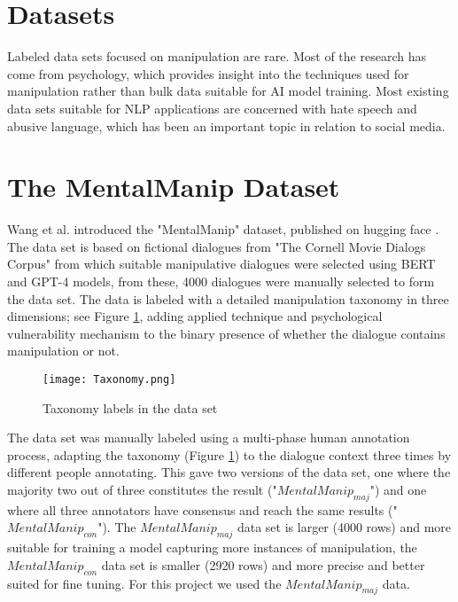 \documentclass[
	letterpaper, %
	12pt, %
	unnumberedsections, %
	twoside, %
]{LTJournalArticle}
\begin{document}
\section{Datasets}
Labeled data sets focused on manipulation are rare. Most of the research has come from psychology, which provides insight into the techniques used for manipulation rather than bulk data suitable for AI model training. Most existing data sets suitable for NLP applications are concerned with hate speech and abusive language, which has been an important topic in relation to social media.

\section{The MentalManip Dataset}
Wang et al. \cite{MentalManip} introduced the "MentalManip" dataset, published on hugging face \cite{MentalManipDataset}. The data set is based on fictional dialogues from "The Cornell Movie Dialogs Corpus" \cite{CornellMovieCorpus} from which suitable manipulative dialogues were selected using BERT and GPT-4 models, from these, 4000 dialogues were manually selected to form the data set. The data is labeled with a detailed manipulation taxonomy in three dimensions; see Figure \ref{fig:Taxonomy}, adding applied technique and psychological vulnerability mechanism to the binary presence of whether the dialogue contains manipulation or not.

\begin{figure}[!htp] %
	\centering
	\texttt{[image: Taxonomy.png]}
	\caption{Taxonomy labels in the data set}
	\label{fig:Taxonomy}
\end{figure}

The data set was manually labeled using a multi-phase human annotation process, adapting the taxonomy (Figure \ref{fig:Taxonomy}) to the dialogue context three times by different people annotating. This gave two versions of the data set, one where the majority two out of three constitutes the result ("$MentalManip_{maj}$") and one where all three annotators have consensus and reach the same results ("$MentalManip_{con}$"). The $MentalManip_{maj}$ data set is larger (4000 rows) and more suitable for training a model capturing more instances of manipulation, the $MentalManip_{con}$ data set is smaller (2920 rows) and more precise and better suited for fine tuning. For this project we used the $MentalManip_{maj}$ data.
\end{document}
